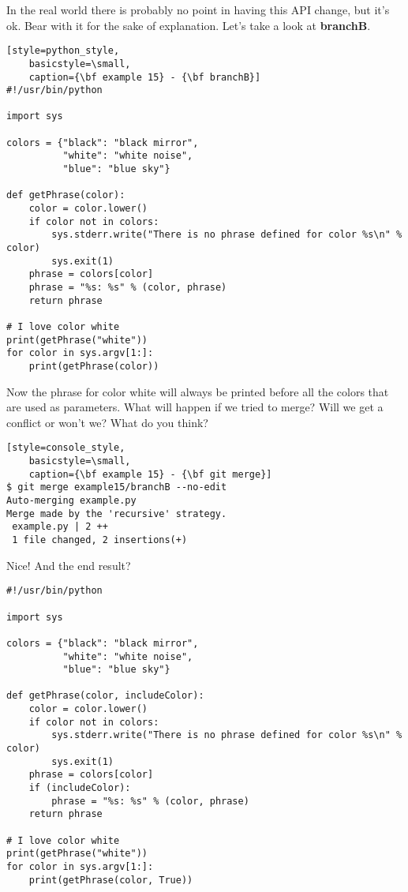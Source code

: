 In the real world there is probably no point in having this API change, but it's ok. Bear with it for the sake of explanation. Let's
take a look at {\bf branchB}.

\begin{lstlisting}[style=python_style,
	basicstyle=\small,
	caption={\bf example 15} - {\bf branchB}]
#!/usr/bin/python

import sys

colors = {"black": "black mirror",
          "white": "white noise",
          "blue": "blue sky"}

def getPhrase(color):
    color = color.lower()
    if color not in colors:
        sys.stderr.write("There is no phrase defined for color %s\n" % color)
        sys.exit(1)
    phrase = colors[color]
    phrase = "%s: %s" % (color, phrase)
    return phrase

# I love color white
print(getPhrase("white"))
for color in sys.argv[1:]:
    print(getPhrase(color))
\end{lstlisting}

Now the phrase for color white will always be printed before all the colors that are used as parameters. What will happen if we
tried to merge? Will we get a conflict or won't we? What do you think?

\begin{lstlisting}[style=console_style,
	basicstyle=\small,
	caption={\bf example 15} - {\bf git merge}]
$ git merge example15/branchB --no-edit
Auto-merging example.py
Merge made by the 'recursive' strategy.
 example.py | 2 ++
 1 file changed, 2 insertions(+)
\end{lstlisting}

Nice! And the end result?

\begin{lstlisting}[style=python_style,
	basicstyle=\small,
	caption={\bf example 15} - final result]
#!/usr/bin/python

import sys

colors = {"black": "black mirror",
          "white": "white noise",
          "blue": "blue sky"}

def getPhrase(color, includeColor):
    color = color.lower()
    if color not in colors:
        sys.stderr.write("There is no phrase defined for color %s\n" % color)
        sys.exit(1)
    phrase = colors[color]
    if (includeColor):
        phrase = "%s: %s" % (color, phrase)
    return phrase

# I love color white
print(getPhrase("white"))
for color in sys.argv[1:]:
    print(getPhrase(color, True))
\end{lstlisting}

